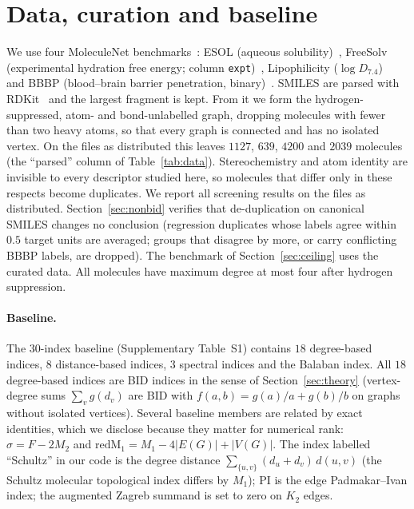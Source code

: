 \documentclass[11pt,a4paper]{article}
\theoremstyle{definition}
\begin{document}
\section{Data, curation and baseline}\label{sec:data}

We use four MoleculeNet benchmarks~\cite{MoleculeNet}: ESOL (aqueous
solubility)~\cite{Delaney2004ESOL}, FreeSolv (experimental hydration
free energy; column \texttt{expt})~\cite{Mobley2014FreeSolv},
Lipophilicity ($\log D_{7.4}$)~\cite{LipophilicityChEMBL} and BBBP
(blood--brain barrier penetration, binary)~\cite{Martins2012BBBP}.
SMILES are parsed with RDKit~\cite{RDKit} and the largest fragment is
kept. From it we form the hydrogen-suppressed, atom- and
bond-unlabelled graph, dropping molecules with fewer than two heavy
atoms, so that every graph is connected and has no isolated vertex. On
the files as distributed this leaves $1127$, $639$, $4200$ and $2039$
molecules (the ``parsed'' column of Table~\ref{tab:data}).
Stereochemistry and atom identity are invisible to every descriptor
studied here, so molecules that differ only in these respects become
duplicates. We report all screening results on the files as
distributed. Section~\ref{sec:nonbid} verifies that de-duplication on
canonical SMILES changes no conclusion (regression duplicates whose
labels agree within $0.5$ target units are averaged; groups that
disagree by more, or carry conflicting BBBP labels, are dropped). The
benchmark of Section~\ref{sec:ceiling} uses the curated data. All
molecules have maximum degree at most four after hydrogen suppression.



\paragraph{Baseline.} The $30$-index baseline (Supplementary Table~S1)
contains $18$ degree-based indices, $8$ distance-based indices,
$3$ spectral indices and the Balaban index. All $18$ degree-based
indices are BID indices in the sense of Section~\ref{sec:theory}
(vertex-degree sums $\sum_v g(d_v)$ are BID with
$f(a,b)=g(a)/a+g(b)/b$ on graphs without isolated vertices). Several
baseline members are related by exact identities, which we disclose
because they matter for numerical rank: $\sigma = F-2M_2$ and
$\mathrm{redM}_1 = M_1-4|E(G)|+|V(G)|$. The index
labelled ``Schultz'' in our code is the degree distance
$\sum_{\{u,v\}}(d_u+d_v)\,d(u,v)$ (the Schultz molecular topological
index differs by $M_1$); PI is the edge Padmakar--Ivan index; the
augmented Zagreb summand is set to zero on $K_2$ edges.
\end{document}
